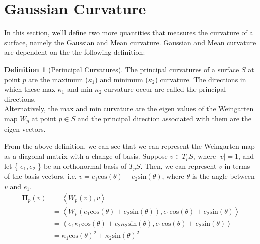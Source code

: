 \documentclass{article}
\theoremstyle{plain}
\theoremstyle{definition}
\newtheorem{definition}{Definition}
\theoremstyle{remark}
\begin{document}

\section{Gaussian Curvature}
In this section, we'll define two more quantities that measures the curvature of a surface, namely the Gaussian and Mean curvature. Gaussian and Mean curvature are dependent on the the following definition:

\begin{definition}[Perincipal Curvatures]
    The principal curvatures of a surface \( S\) at point \(p\) are the maximum (\(\kappa_1\)) and minimum (\( \kappa_2 \)) curvature. The directions in which these max \(\kappa_1\) and min \(\kappa_2\) curvature occur are called the principal directions. \\
    Alternatively, the max and min curvature are the eigen values of the Weingarten map \( W_p\) at point \(p \in S\) and the principal direction associated with them are the eigen vectors.
\end{definition}

From the above definition, we can see that we can represent the Weingarten map as a diagonal matrix with a change of basis. Suppose \(v \in T_pS\), where \(|v| = 1\), and let \{ \(e_1, e_2\) \} be an  orthonormal basis of \( T_pS\). Then, we can represent \(v\) in terms of the basis vectors, i.e. \( v = e_1 \text{cos}(\theta) + e_2 \text{sin}(\theta)\), where \( \theta \) is the angle between \( v\) and \( e_1\).
\begin{align*}
    \mathbf{II}_p(v) & = \left\langle W_p(v), v\right\rangle                                                                              \\
                     & = \left\langle W_p(e_1 \text{cos}(\theta) + e_2 \text{sin}(\theta)), e_1 \text{cos}(\theta) + e_2 \text{sin}(\theta) \right\rangle             \\
                     & = \left\langle e_1 \kappa_1 \text{cos}(\theta) + e_2 \kappa_2 \text{sin}(\theta), e_1 \text{cos}(\theta) + e_2 \text{sin}(\theta)\right\rangle \\
                     & = \kappa_1 \text{cos}(\theta)^2 + \kappa_2 \text{sin}(\theta)^2
\end{align*}
\end{document}
